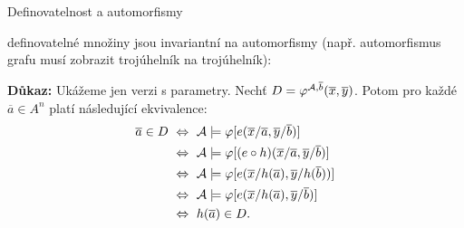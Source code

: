 \documentclass{beamer}
\begin{document}
\begin{frame}{Definovatelnost a automorfismy}

    \pause
    definovatelné množiny jsou \alert{invariantní} na automorfismy (např. automorfismus grafu musí zobrazit trojúhelník na trojúhelník):

    \medskip

    \pause

    \pause
    \textbf{Důkaz:}
    Ukážeme jen verzi s parametry. Nechť $D=\varphi^{\mathcal{A},\overline{b}}(\overline{x},\overline{y})$. Potom pro každé $\overline{a}\in A^n$ platí následující ekvivalence:\pause
    \begin{align*}
    \overline{a}\in D\ 
    &\Leftrightarrow\ \A\models \varphi[e(\overline{x}/\overline{a},\overline{y}/\overline{b})]\\
    &\Leftrightarrow\  \A\models \varphi[(e\circ h)(\overline{x}/\overline{a},\overline{y}/\overline{b})]\\
    &\Leftrightarrow\ \A\models \varphi[e(\overline{x}/h(\overline{a}),\overline{y}/h(\overline{b}))]\\
    &\Leftrightarrow\ \A\models \varphi[e(\overline{x}/h(\overline{a}),\overline{y}/\overline{b})]\\
    &\Leftrightarrow\ h(\overline{a})\in D.
    \end{align*}

    \vspace{-0.85cm}
    \hfill\qedsymbol    

\end{frame}
\end{document}
